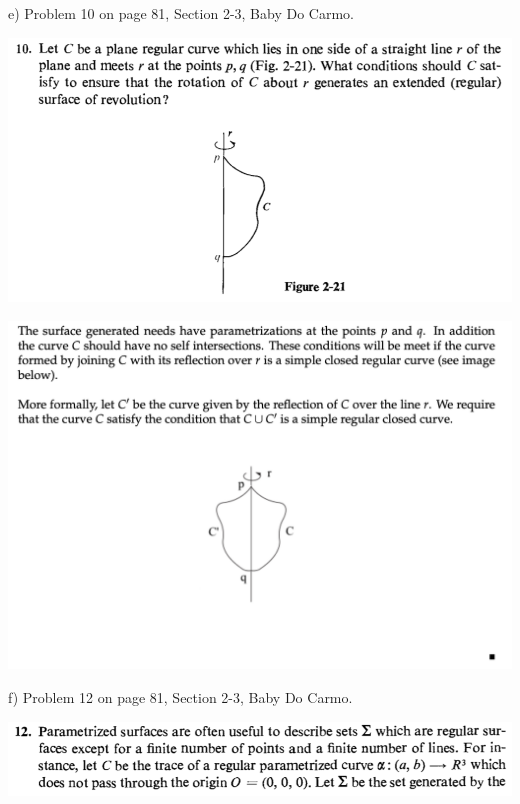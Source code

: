 \documentclass[10pt,letterpaper]{hmcpset}
\begin{document}
\newpage \begin{problem}
e) Problem 10 on page 81, Section 2-3, Baby Do Carmo.

\includegraphics[scale=0.7]{Ce.png}
\end{problem}
\begin{solution}
  \includegraphics[scale=.8]{e_solution.png}
\end{solution}

\newpage \begin{problem}
f) Problem 12 on page 81, Section 2-3, Baby Do Carmo.

\includegraphics[scale=0.7]{Cf1.png}
\end{problem}
\begin{solution}
\end{solution}
\end{document}
